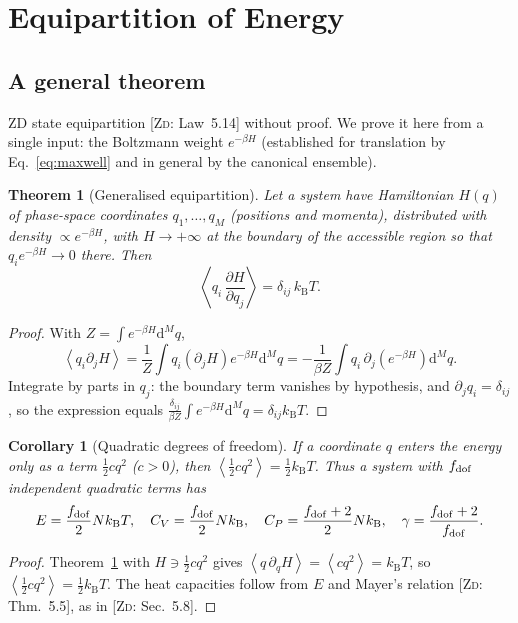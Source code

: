 \documentclass[11pt,a4paper]{report}
\theoremstyle{definition}
\theoremstyle{plain}
\newtheorem{theorem}[definition]{Theorem}
\newtheorem{corollary}[definition]{Corollary}
\newcommand{\ZD}[1]{[\textsc{Zd}: #1]}   %
\newcommand{\kB}{k_{\mathrm{B}}}
\newcommand{\dd}{\mathrm{d}}
\newcommand{\avg}[1]{\left\langle #1\right\rangle}
\begin{document}
\section{Equipartition of Energy}
\label{sec:equip}

\subsection{A general theorem}

ZD state equipartition \ZD{Law~5.14} without proof. We prove it here from a single input: the Boltzmann weight $e^{-\beta H}$ (established for translation by Eq.~\eqref{eq:maxwell} and in general by the canonical ensemble).

\begin{theorem}[Generalised equipartition]\label{thm:equip}
Let a system have Hamiltonian $H(q)$ of phase-space coordinates $q_1,\dots,q_M$ (positions and momenta), distributed with density $\propto e^{-\beta H}$, with $H\to+\infty$ at the boundary of the accessible region so that $q_ie^{-\beta H}\to0$ there. Then
\begin{equation}
\avg{q_i\,\frac{\partial H}{\partial q_j}}=\delta_{ij}\,\kB T .
\end{equation}
\end{theorem}
\begin{proof}
With $Z=\int e^{-\beta H}\dd^Mq$,
\[
\avg{q_i\partial_jH}=\frac1Z\int q_i(\partial_jH)e^{-\beta H}\dd^Mq=-\frac{1}{\beta Z}\int q_i\,\partial_j\!\left(e^{-\beta H}\right)\dd^Mq .
\]
Integrate by parts in $q_j$: the boundary term vanishes by hypothesis, and $\partial_jq_i=\delta_{ij}$, so the expression equals $\frac{\delta_{ij}}{\beta Z}\int e^{-\beta H}\dd^Mq=\delta_{ij}\kB T$.
\end{proof}

\begin{corollary}[Quadratic degrees of freedom]\label{cor:quad}
If a coordinate $q$ enters the energy only as a term $\tfrac12cq^2$ ($c>0$), then $\avg{\tfrac12cq^2}=\tfrac12\kB T$. Thus a system with $f_{\rm dof}$ independent quadratic terms has
\begin{equation}
E=\frac{f_{\rm dof}}{2}N\kB T,\quad C_V=\frac{f_{\rm dof}}{2}N\kB,\quad C_P=\frac{f_{\rm dof}+2}{2}N\kB,\quad\gamma=\frac{f_{\rm dof}+2}{f_{\rm dof}} .
\end{equation}
\end{corollary}
\begin{proof}
Theorem~\ref{thm:equip} with $H\ni\tfrac12cq^2$ gives $\avg{q\,\partial_qH}=\avg{cq^2}=\kB T$, so $\avg{\tfrac12cq^2}=\tfrac12\kB T$. The heat capacities follow from $E$ and Mayer's relation \ZD{Thm.~5.5}, as in \ZD{Sec.~5.8}.
\end{proof}
\end{document}
